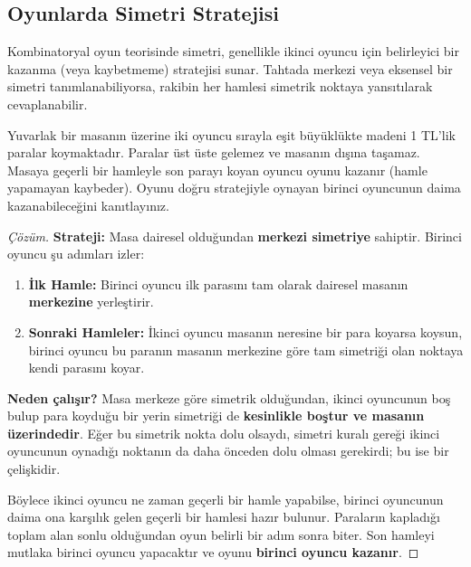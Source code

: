 \subsection{Oyunlarda Simetri Stratejisi}

Kombinatoryal oyun teorisinde simetri, genellikle ikinci oyuncu için belirleyici bir kazanma (veya kaybetmeme) stratejisi sunar. Tahtada merkezi veya eksensel bir simetri tanımlanabiliyorsa, rakibin her hamlesi simetrik noktaya yansıtılarak cevaplanabilir.

\begin{example}
Yuvarlak bir masanın üzerine iki oyuncu sırayla eşit büyüklükte madeni 1 TL'lik paralar koymaktadır. Paralar üst üste gelemez ve masanın dışına taşamaz. Masaya geçerli bir hamleyle son parayı koyan oyuncu oyunu kazanır (hamle yapamayan kaybeder). Oyunu doğru stratejiyle oynayan birinci oyuncunun daima kazanabileceğini kanıtlayınız.
\end{example}

\begin{proof}[Çözüm]
\textbf{Strateji:}
Masa dairesel olduğundan \textbf{merkezi simetriye} sahiptir. Birinci oyuncu şu adımları izler:

\begin{enumerate}
    \item \textbf{İlk Hamle:} Birinci oyuncu ilk parasını tam olarak dairesel masanın \textbf{merkezine} yerleştirir.
    \item \textbf{Sonraki Hamleler:} İkinci oyuncu masanın neresine bir para koyarsa koysun, birinci oyuncu bu paranın masanın merkezine göre tam simetriği olan noktaya kendi parasını koyar.
\end{enumerate}

\textbf{Neden çalışır?}
Masa merkeze göre simetrik olduğundan, ikinci oyuncunun boş bulup para koyduğu bir yerin simetriği de \textbf{kesinlikle boştur ve masanın üzerindedir}. 
Eğer bu simetrik nokta dolu olsaydı, simetri kuralı gereği ikinci oyuncunun oynadığı noktanın da daha önceden dolu olması gerekirdi; bu ise bir çelişkidir.

Böylece ikinci oyuncu ne zaman geçerli bir hamle yapabilse, birinci oyuncunun daima ona karşılık gelen geçerli bir hamlesi hazır bulunur. Paraların kapladığı toplam alan sonlu olduğundan oyun belirli bir adım sonra biter. Son hamleyi mutlaka birinci oyuncu yapacaktır ve oyunu \textbf{birinci oyuncu kazanır}.
\end{proof}

\begin{center}
\end{center}

